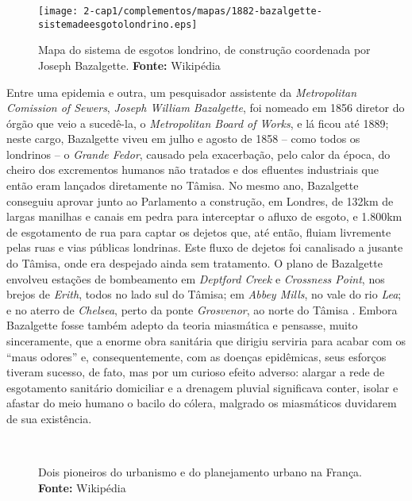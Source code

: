 \begin{figure}[!htp]
\centering
\texttt{[image: 2-cap1/complementos/mapas/1882-bazalgette-sistemadeesgotolondrino.eps]}
\label{fig:esgotoslondres1882} 
\caption{Mapa do sistema de esgotos londrino, de construção coordenada por Joseph Bazalgette. \textbf{Fonte:} Wikipédia}
\end{figure}

Entre uma epidemia e outra, um pesquisador assistente da \textit{Metropolitan Comission of Sewers}, \textit{Joseph William Bazalgette}, foi nomeado em 1856 diretor do órgão que veio a sucedê-la, o \textit{Metropolitan Board of Works}, e lá ficou até 1889; neste cargo, Bazalgette viveu em julho e agosto de 1858 -- como todos os londrinos -- o \textit{Grande Fedor}, causado pela exacerbação, pelo calor da época, do cheiro dos excrementos humanos não tratados e dos efluentes industriais que então eram lançados diretamente no Tâmisa. No mesmo ano, Bazalgette conseguiu aprovar junto ao Parlamento a construção, em Londres, de 132km de largas manilhas e canais em pedra para interceptar o afluxo de esgoto, e 1.800km de esgotamento de rua para captar os dejetos que, até então, fluiam livremente pelas ruas e vias públicas londrinas. Este fluxo de dejetos foi canalisado a jusante do Tâmisa, onde era despejado ainda sem tratamento. O plano de Bazalgette envolveu estações de bombeamento em \textit{Deptford Creek} e \textit{Crossness Point}, nos brejos de \textit{Erith}, todos no lado sul do Tâmisa; em \textit{Abbey Mills}, no vale do rio \textit{Lea}; e no aterro de \textit{Chelsea}, perto da ponte \textit{Grosvenor}, ao norte do Tâmisa \cite{bazalgette_london_1865, bazalgette_metropolitan_1865}. Embora Bazalgette fosse também adepto da teoria miasmática e pensasse, muito sinceramente, que a enorme obra sanitária que dirigiu serviria para acabar com os ``maus odores'' e, consequentemente, com as doenças epidêmicas, seus esforços tiveram sucesso, de fato, mas por um curioso efeito adverso: alargar a rede de esgotamento sanitário domiciliar e a drenagem pluvial significava conter, isolar e afastar do meio humano o bacilo do cólera, malgrado os miasmáticos duvidarem de sua existência.

\begin{figure}[!htp]
\centering
{}
\  %
\caption{Dois pioneiros do urbanismo e do planejamento urbano na França. \textbf{Fonte:} Wikipédia}
\end{figure}

